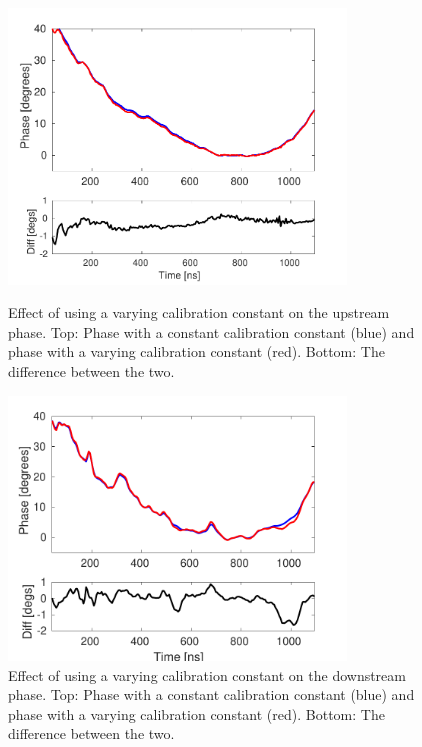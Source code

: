 \begin{figure}
  \centering
  \includegraphics[width=0.8\textwidth]{Figures/phaseMons/multiSampMon2Along}
  \caption{Effect of using a varying calibration constant on the upstream phase. Top: Phase with a constant calibration constant (blue) and phase with a varying calibration constant (red). Bottom: The difference between the two.}
  \label{f:multiSampMon2Along}
  \includegraphics[width=0.8\textwidth]{Figures/phaseMons/multiSampMon3Along}
  \caption{Effect of using a varying calibration constant on the downstream phase. Top: Phase with a constant calibration constant (blue) and phase with a varying calibration constant (red). Bottom: The difference between the two.}
  \label{f:multiSampMon3Along}
\end{figure}




